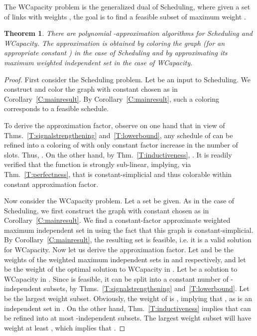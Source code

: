 \documentclass[11pt]{article}
\newtheorem{theorem}{Theorem}
\newcommand{\wcapacity}{\textsf{WCapacity}}
\newcommand{\scheduling}{\textsf{Scheduling}}
\begin{document}
 The {\wcapacity} problem is the generalized dual of {\scheduling}, where given a set  of links  with weights , the goal is to find a feasible subset  of maximum weight .


\begin{theorem}
There are polynomial -approximation algorithms for {\scheduling} and {\wcapacity}. The approximation is obtained by 
coloring the graph  (for an appropriate constant ) in the case of {\scheduling} and by approximating its maximum weighted independent set in the case of {\wcapacity}.
\end{theorem}

\begin{proof}
First consider the {\scheduling} problem. Let  be an input to {\scheduling}.  We construct and color the graph  with constant
 chosen as in Corollary~\ref{C:mainresult}. By Corollary~\ref{C:mainresult}, such a coloring corresponds to
a feasible schedule.

To derive the approximation factor, observe on one hand that in view of Thms.\ \ref{T:signalstrengthening}
and~\ref{T:lowerbound}, any schedule of  can be refined into a coloring of  with only constant factor
increase in the number of slots. Thus, .  On the other hand, by Thm.\
\ref{T:inductiveness}, .  It is readily verified that the function  is strongly sub-linear,
implying, via Thm.\ \ref{T:perfectness}, that  is
constant-simplicial and thus colorable within constant approximation factor.

Now consider the {\wcapacity} problem. Let a set  be given. As in the case of {\scheduling}, we first construct the graph  with constant  chosen as in Corollary~\ref{C:mainresult}. We find a constant-factor approximate weighted maximum independent set in  using the fact that this graph is constant-simplicial. By Corollary~\ref{C:mainresult}, the resulting set is feasible, i.e. it is a valid solution for {\wcapacity}. Now let us derive the approximation factor. 
Let  and  be the weights of the weighted maximum independent sets in  and  respectively, and let  be the weight of the optimal solution to {\wcapacity} in . Let  be a solution to {\wcapacity} in . Since  is feasible,  it can be split into a constant number of -independent subsets, by Thms.\ \ref{T:signalstrengthening} and~\ref{T:lowerbound}. Let  be the largest weight subset. Obviously, the weight of  is  , implying that , as  is an independent set in . On the other hand, Thm.\ \ref{T:inductiveness} implies that  can be refined into  at  most  -independent subsets. The largest weight subset will have weight at least , which implies that .
\end{proof}
\end{document}
